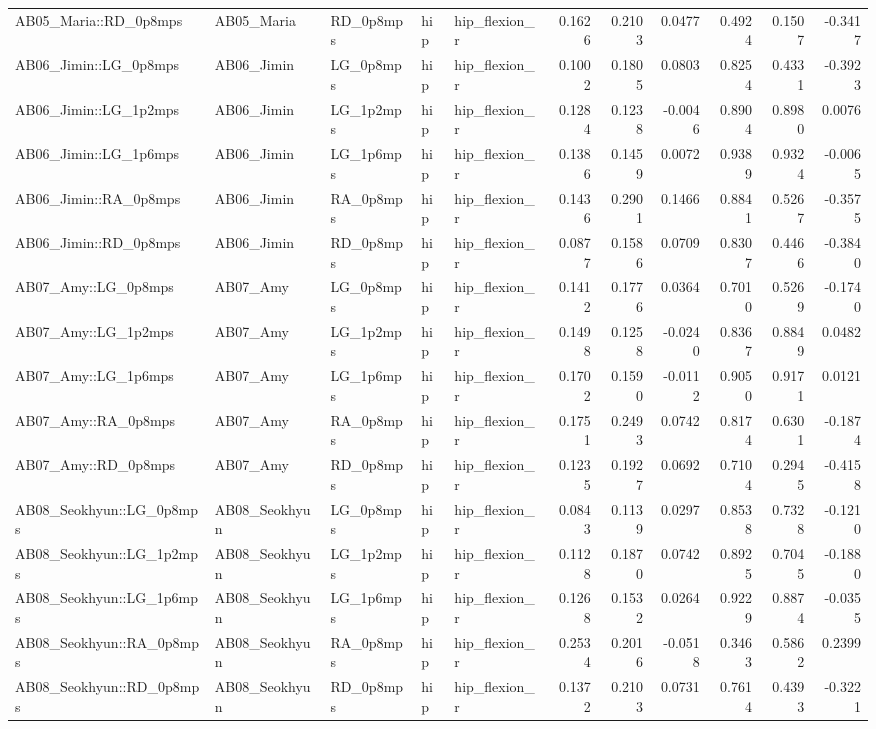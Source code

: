 \begin{table}
\begin{tabular}{lllllrrrrrr}
AB05_Maria::RD_0p8mps & AB05_Maria & RD_0p8mps & hip & hip_flexion_r & 0.1626 & 0.2103 & 0.0477 & 0.4924 & 0.1507 & -0.3417 \\
AB06_Jimin::LG_0p8mps & AB06_Jimin & LG_0p8mps & hip & hip_flexion_r & 0.1002 & 0.1805 & 0.0803 & 0.8254 & 0.4331 & -0.3923 \\
AB06_Jimin::LG_1p2mps & AB06_Jimin & LG_1p2mps & hip & hip_flexion_r & 0.1284 & 0.1238 & -0.0046 & 0.8904 & 0.8980 & 0.0076 \\
AB06_Jimin::LG_1p6mps & AB06_Jimin & LG_1p6mps & hip & hip_flexion_r & 0.1386 & 0.1459 & 0.0072 & 0.9389 & 0.9324 & -0.0065 \\
AB06_Jimin::RA_0p8mps & AB06_Jimin & RA_0p8mps & hip & hip_flexion_r & 0.1436 & 0.2901 & 0.1466 & 0.8841 & 0.5267 & -0.3575 \\
AB06_Jimin::RD_0p8mps & AB06_Jimin & RD_0p8mps & hip & hip_flexion_r & 0.0877 & 0.1586 & 0.0709 & 0.8307 & 0.4466 & -0.3840 \\
AB07_Amy::LG_0p8mps & AB07_Amy & LG_0p8mps & hip & hip_flexion_r & 0.1412 & 0.1776 & 0.0364 & 0.7010 & 0.5269 & -0.1740 \\
AB07_Amy::LG_1p2mps & AB07_Amy & LG_1p2mps & hip & hip_flexion_r & 0.1498 & 0.1258 & -0.0240 & 0.8367 & 0.8849 & 0.0482 \\
AB07_Amy::LG_1p6mps & AB07_Amy & LG_1p6mps & hip & hip_flexion_r & 0.1702 & 0.1590 & -0.0112 & 0.9050 & 0.9171 & 0.0121 \\
AB07_Amy::RA_0p8mps & AB07_Amy & RA_0p8mps & hip & hip_flexion_r & 0.1751 & 0.2493 & 0.0742 & 0.8174 & 0.6301 & -0.1874 \\
AB07_Amy::RD_0p8mps & AB07_Amy & RD_0p8mps & hip & hip_flexion_r & 0.1235 & 0.1927 & 0.0692 & 0.7104 & 0.2945 & -0.4158 \\
AB08_Seokhyun::LG_0p8mps & AB08_Seokhyun & LG_0p8mps & hip & hip_flexion_r & 0.0843 & 0.1139 & 0.0297 & 0.8538 & 0.7328 & -0.1210 \\
AB08_Seokhyun::LG_1p2mps & AB08_Seokhyun & LG_1p2mps & hip & hip_flexion_r & 0.1128 & 0.1870 & 0.0742 & 0.8925 & 0.7045 & -0.1880 \\
AB08_Seokhyun::LG_1p6mps & AB08_Seokhyun & LG_1p6mps & hip & hip_flexion_r & 0.1268 & 0.1532 & 0.0264 & 0.9229 & 0.8874 & -0.0355 \\
AB08_Seokhyun::RA_0p8mps & AB08_Seokhyun & RA_0p8mps & hip & hip_flexion_r & 0.2534 & 0.2016 & -0.0518 & 0.3463 & 0.5862 & 0.2399 \\
AB08_Seokhyun::RD_0p8mps & AB08_Seokhyun & RD_0p8mps & hip & hip_flexion_r & 0.1372 & 0.2103 & 0.0731 & 0.7614 & 0.4393 & -0.3221 \\

\end{tabular}
\end{table}
